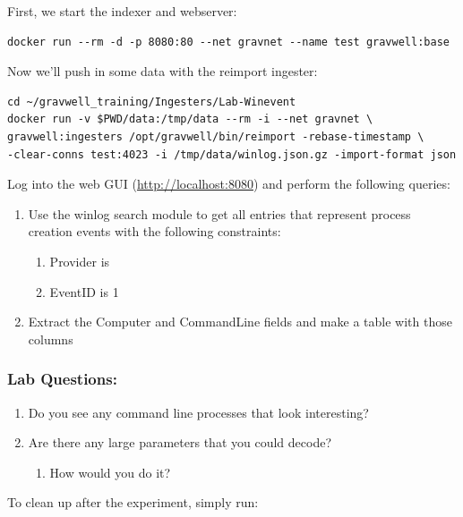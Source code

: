 First, we start the indexer and webserver:

\begin{Verbatim}[breaklines=true]
docker run --rm -d -p 8080:80 --net gravnet --name test gravwell:base
\end{Verbatim}

Now we'll push in some data with the reimport ingester:

\begin{Verbatim}[breaklines=true]
cd ~/gravwell_training/Ingesters/Lab-Winevent
docker run -v $PWD/data:/tmp/data --rm -i --net gravnet \
gravwell:ingesters /opt/gravwell/bin/reimport -rebase-timestamp \
-clear-conns test:4023 -i /tmp/data/winlog.json.gz -import-format json
\end{Verbatim}

Log into the web GUI (\href{http://localhost:8080}{http://localhost:8080}) and perform the following queries:

\begin{enumerate}
\item Use the winlog search module to get all entries that represent process creation events with the following constraints:
	\begin{enumerate}
	\item Provider is \code{Microsoft-Windows-Sysmon}
	\item EventID is 1
	\end{enumerate}
\item Extract the Computer and CommandLine fields and make a table with those columns
\end{enumerate}

\subsubsection{Lab Questions:}

\begin{enumerate}
\item Do you see any command line processes that look interesting?
\item Are there any large parameters that you could decode?
	\begin{enumerate}
	\item How would you do it?
	\end{enumerate}
\end{enumerate}

To clean up after the experiment, simply run:


